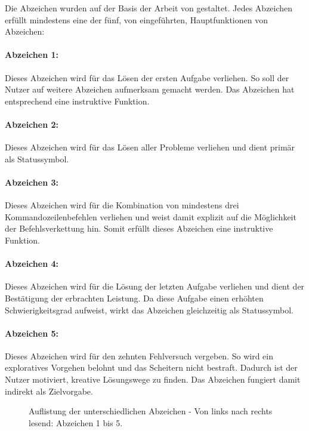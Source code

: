 Die Abzeichen wurden auf der Basis der Arbeit von  gestaltet. Jedes Abzeichen erfüllt mindestens eine der fünf, von  eingeführten, Hauptfunktionen von Abzeichen:

\paragraph{Abzeichen 1:}
Dieses Abzeichen wird für das Lösen der ersten Aufgabe verliehen. So soll der Nutzer auf weitere Abzeichen aufmerksam gemacht werden. Das Abzeichen hat entsprechend eine instruktive Funktion.

\paragraph{Abzeichen 2:}
Dieses Abzeichen wird für das Lösen aller Probleme verliehen und dient primär als Statussymbol.

\paragraph{Abzeichen 3:}
Dieses Abzeichen wird für die Kombination von mindestens drei Kommandozeilenbefehlen verliehen und weist damit explizit auf die Möglichkeit der Befehlsverkettung hin. Somit erfüllt dieses Abzeichen eine instruktive Funktion.

\paragraph{Abzeichen 4:}
Dieses Abzeichen wird für die Lösung der letzten Aufgabe verliehen und dient der Bestätigung der erbrachten Leistung. Da diese Aufgabe einen erhöhten Schwierigkeitsgrad aufweist, wirkt das Abzeichen gleichzeitig als Statussymbol.

\paragraph{Abzeichen 5:}
Dieses Abzeichen wird für den zehnten Fehlversuch vergeben. So wird ein exploratives Vorgehen belohnt und das Scheitern nicht bestraft. Dadurch ist der Nutzer motiviert, kreative Lösungswege zu finden. Das Abzeichen fungiert damit indirekt als Zielvorgabe.


\begin{figure}[htbp]
    \centering
    
    
    
    
    
    \caption[Auflistung der unterschiedlichen Abzeichen]{Auflistung der unterschiedlichen Abzeichen - Von links nach rechts lesend: Abzeichen 1 bis 5.}
\end{figure}


